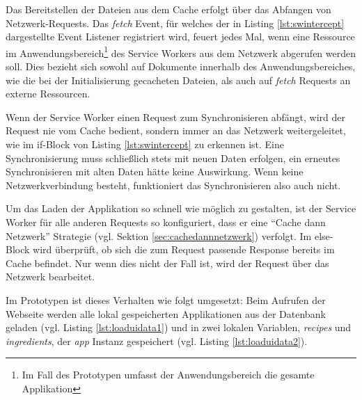 \documentclass[a4paper, 12pt]{scrreprt}
\begin{document}
\begin{minipage}{\linewidth}
	
\end{minipage}

\begin{minipage}{\linewidth}
	
\end{minipage}

Das Bereitstellen der Dateien aus dem Cache erfolgt über das Abfangen von Netzwerk-Requests. Das \textit{fetch} Event, für welches der in Listing \ref{lst:swintercept} dargestellte Event Listener registriert wird, feuert jedes Mal, wenn eine Ressource im Anwendungsbereich\footnote{Im Fall des Prototypen umfasst der Anwendungsbereich die gesamte Applikation} des Service Workers aus dem Netzwerk abgerufen werden soll. Dies bezieht sich sowohl auf Dokumente innerhalb des Anwendungsbereiches, wie die bei der Initialisierung gecacheten Dateien, als auch auf \textit{fetch} Requests an externe Ressourcen.

Wenn der Service Worker einen Request zum Synchronisieren abfängt, wird der Request nie vom Cache bedient, sondern immer an das Netzwerk weitergeleitet, wie im if-Block von Listing \ref{lst:swintercept} zu erkennen ist. Eine Synchronisierung muss schließlich stets mit neuen Daten erfolgen, ein erneutes Synchronisieren mit alten Daten hätte keine Auswirkung. Wenn keine Netzwerkverbindung besteht, funktioniert das Synchronisieren also auch nicht.

Um das Laden der Applikation so schnell wie möglich zu gestalten, ist der Service Worker für alle anderen Requests so konfiguriert, dass er eine \enquote{Cache dann Netzwerk} Strategie (vgl. Sektion \ref{sec:cachedannnetzwerk}) verfolgt. Im else-Block wird überprüft, ob sich die zum Request passende Response bereits im Cache befindet. Nur wenn dies nicht der Fall ist, wird der Request über das Netzwerk bearbeitet.

\begin{minipage}{\linewidth}
	
\end{minipage}

Im Prototypen ist dieses Verhalten wie folgt umgesetzt: 
Beim Aufrufen der Webseite werden alle lokal gespeicherten Applikationen aus der Datenbank geladen (vgl. Listing \ref{lst:loaduidata1}) und in zwei lokalen Variablen, \textit{recipes} und \textit{ingredients}, der \textit{app} Instanz gespeichert (vgl. Listing \ref{lst:loaduidata2}).
\end{document}
